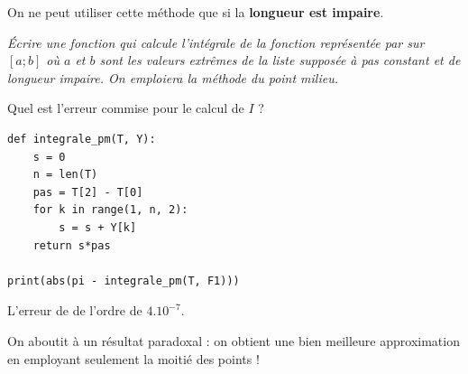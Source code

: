On ne peut utiliser cette méthode que si la {\bf longueur est impaire}.
\begin{Exercise}\it
Écrire une fonction  qui calcule l'intégrale de la fonction représentée par  sur $[a; b]$ où $a$ et $b$ sont les valeurs extrêmes de la liste  supposée à pas constant et de longueur impaire. On emploiera la méthode du point milieu.

Quel est l'erreur commise pour le calcul de $I$ ?

\end{Exercise}
\begin{Answer}
\begin{lstlisting}
def integrale_pm(T, Y):
    s = 0
    n = len(T)
    pas = T[2] - T[0]
    for k in range(1, n, 2):
        s = s + Y[k]
    return s*pas

print(abs(pi - integrale_pm(T, F1)))
\end{lstlisting}

L'erreur de de l'ordre de $4.10^{-7}$.
\end{Answer}
On aboutit à un résultat paradoxal : on obtient une bien meilleure approximation en employant seulement la moitié des points !
